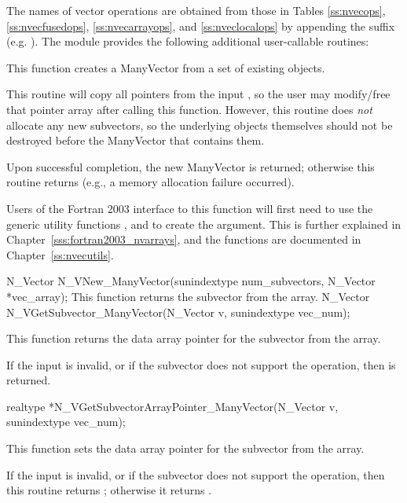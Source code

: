 The names of vector operations are obtained from those in Tables
\ref{ss:nvecops}, \ref{ss:nvecfusedops}, \ref{ss:nvecarrayops}, and
\ref{ss:nveclocalops} by appending the suffix 
(e.g. ).
The module {\nvecmanyvector} provides the following additional
user-callable routines:
{
  This function creates a ManyVector from a set of existing {\nvector}
  objects.

  This routine will copy all  pointers from the input
  , so the user may modify/free that pointer array
  after calling this function.  However, this routine does \emph{not}
  allocate any new subvectors, so the underlying {\nvector} objects
  themselves should not be destroyed before the ManyVector that
  contains them.

  Upon successful completion, the new ManyVector is returned;
  otherwise this routine returns  (e.g., a memory allocation
  failure occurred).

  Users of the Fortran 2003 interface to this function will first need
  to use the generic  utility functions
  , and  to create
  the  argument. This is further explained in 
  Chapter~\ref{sss:fortran2003_nvarrays}, and the functions are documented
  in Chapter~\ref{ss:nvecutils}.
}
{
  N\_Vector N\_VNew\_ManyVector(sunindextype num\_subvectors,
  N\_Vector *vec\_array);
}
{
  This function returns the  subvector from the {\nvector}
  array.
}
{
  N\_Vector N\_VGetSubvector\_ManyVector(N\_Vector v, sunindextype vec\_num);
}
{
  This function returns the data array pointer for the 
  subvector from the {\nvector} array.

  If the input  is invalid, or if the subvector does not
  support the  operation, then  is returned.
}
{
  realtype *N\_VGetSubvectorArrayPointer\_ManyVector(N\_Vector v, sunindextype vec\_num);
}
{
  This function sets the data array pointer for the 
  subvector from the {\nvector} array.

  If the input  is invalid, or if the subvector does not
  support the  operation, then this routine
  returns ; otherwise it returns .
}
